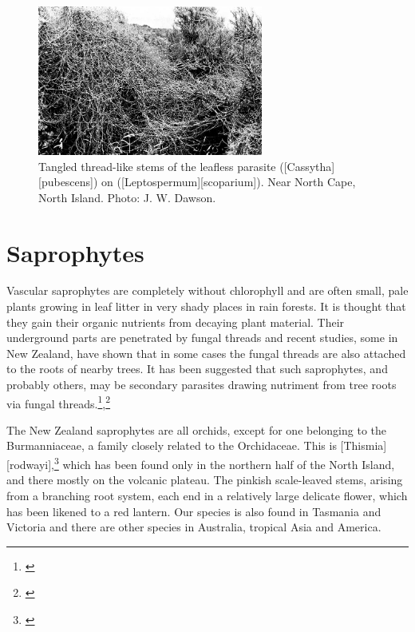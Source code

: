 \begin{figure}
	\includegraphics[width=0.66\textwidth]{graphics/figure59cassytha.jpg}
	\centering
	\caption[Tangled thread-like stems of the leafless parasite taihoa (\emph{Cassytha pubescens})]{Tangled thread-like stems of the leafless parasite  ([Cassytha][pubescens]) on  ([Leptospermum][scoparium]).
	Near North Cape, North Island.
	Photo: J. W. Dawson.}%
	\label{fig:59cassytha}
\end{figure}

\section{Saprophytes}

Vascular saprophytes are completely without chlorophyll and are often small, pale plants growing in leaf litter in very shady places in rain forests.
It is thought that they gain their organic nutrients from decaying plant material.
Their underground parts are penetrated by fungal threads and recent studies, some in New Zealand, have shown that in some cases the fungal threads are also attached to the roots of nearby trees.
It has been suggested that such saprophytes, and probably others, may be secondary parasites drawing nutriment from tree roots via fungal threads.\footnote{\cite{campbell1962mycorrhiza}},\footnote{\cite{campbell1968investigation}}

The New Zealand saprophytes are all orchids, except for one belonging to the Burmanniaceae, a family closely related to the Orchidaceae.
This is [Thismia][rodwayi],\footnote{\cite{campbell1968investigation}} which has been found only in the northern half of the North Island, and there mostly on the volcanic plateau.
The pinkish scale-leaved stems, arising from a branching root system, each end in a relatively large delicate flower, which has been likened to a red lantern.
Our species is also found in Tasmania and Victoria and there are other species in Australia, tropical Asia and America.

